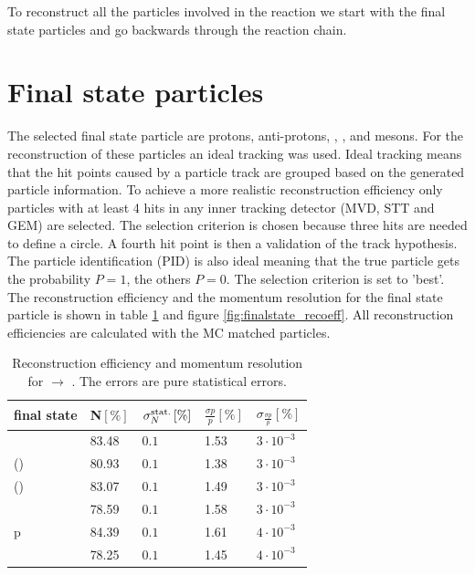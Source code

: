 To reconstruct all the particles involved in the reaction we start with the final state particles and go backwards through the reaction chain.

\section{Final state particles}
	The selected final state particle are protons, anti-protons, \piminus, \piplus, \kminus and \kplus mesons.
	For the reconstruction of these particles an ideal tracking was used.
	Ideal tracking means that the hit points caused by a particle track are grouped based on the generated particle information. 
	To achieve a more realistic reconstruction efficiency only particles with at least 4 hits in any inner tracking detector (MVD, STT and GEM)
	are selected.
	The selection criterion is chosen because three hits are needed to define a circle.
	A fourth hit point is then a validation of the track hypothesis.\\
	The particle identification (PID) is also ideal meaning that the true particle gets the probability $P=1$, the others $P=0$. 
	The selection criterion is set to 'best'.\vspace{11pt} \\
	The reconstruction efficiency and the momentum resolution for the final state particle is shown in table \ref{tab:finalstate_recoeff} and figure \ref{fig:finalstate_recoeff}.
	All reconstruction efficiencies are calculated with the MC matched particles.
	
	\begin{table}
		\centering
		\caption{\propose Reconstruction efficiency and momentum resolution for \pbarp $\rightarrow$ \excitedcascade \anticascade. The errors are pure statistical errors.}
		\label{tab:finalstate_recoeff}
		\begin{tabular}{lllll}
			\hline
			final state & N$\left[\%\right]$ & $\sigma_N^{\textnormal{stat.}}\left[\%\right]$ &$\frac{\sigma p}{p}\left[\%\right]$ & $\sigma_\frac{\sigma p}{p}\left[\%\right]$ \\
			\hline
			\hline
			\piminus & 83.48 & $0.1$& 1.53 & $3\cdot 10^{-3}$\\
			\piplusone(\anticascade) &  80.93& $0.1$& 1.38 & $3\cdot 10^{-3}$ \\
			\piplustwo(\alam) &  83.07& $0.1$&1.49 & $3\cdot 10^{-3}$\\
			\kminus&  78.59& $0.1$& 1.58 & $3\cdot 10^{-3}$\\
			p &  84.39& $0.1$& 1.61 & $4\cdot 10^{-3}$\\
			\antiproton & 78.25 &$0.1$& 1.45 & $4\cdot 10^{-3}$\\\hline
			 
		\end{tabular}
	\end{table}
	
